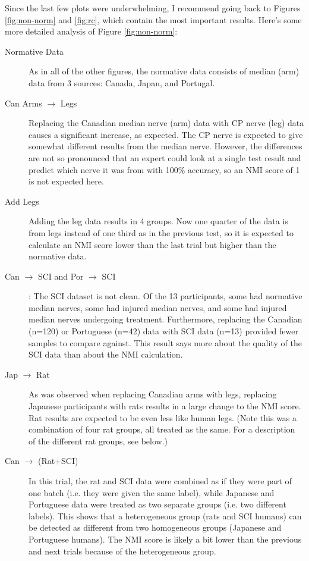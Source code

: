 \documentclass[12pt]{article}
\begin{document}
Since the last few plots were underwhelming, I recommend going back to Figures \ref{fig:non-norm} and \ref{fig:rc}, which contain the most important results. Here's some more detailed analysis of Figure \ref{fig:non-norm}:

\begin{description}
\item [Normative Data] As in all of the other figures, the normative data consists of median (arm) data from 3 sources: Canada, Japan, and Portugal.
\item [Can Arms $\rightarrow$ Legs] Replacing the Canadian median nerve (arm) data with CP nerve (leg) data causes a significant increase, as expected. The CP nerve is expected to give somewhat different results from the median nerve. However, the differences are not so pronounced that an expert could look at a single test result and predict which nerve it was from with 100\% accuracy, so an NMI score of 1 is not expected here.
\item [Add Legs] Adding the leg data results in 4 groups. Now one quarter of the data is from legs instead of one third as in the previous test, so it is expected to calculate an NMI score lower than the last trial but higher than the normative data.
\item [Can $\rightarrow$ SCI and Por $\rightarrow$ SCI]: The SCI dataset is not clean. Of the 13 participants, some had normative median nerves, some had injured median nerves, and some had injured median nerves undergoing treatment. Furthermore, replacing the Canadian (n=120) or Portuguese (n=42) data with SCI data (n=13) provided fewer samples to compare against. This result says more about the quality of the SCI data than about the NMI calculation.
\item [Jap $\rightarrow$ Rat] As was observed when replacing Canadian arms with legs, replacing Japanese participants with rats results in a large change to the NMI score. Rat results are expected to be even less like human legs. (Note this was a combination of four rat groups, all treated as the same. For a description of the different rat groups, see below.)
\item [Can $\rightarrow$ (Rat+SCI)] In this trial, the rat and SCI data were combined as if they were part of one batch (i.e. they were given the same label), while Japanese and Portuguese data were treated as two separate groups (i.e. two different labels). This shows that a heterogeneous group (rats and SCI humans) can be detected as different from two homogeneous groups (Japanese and Portuguese humans). The NMI score is likely a bit lower than the previous and next trials because of the heterogeneous group.

\end{description}
\end{document}
